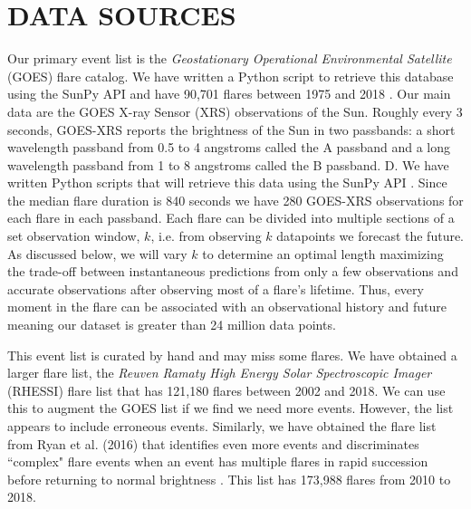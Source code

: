 \documentclass[letterpaper, 10 pt, onecolumn]{ieeeconf}
\begin{document}
\section{DATA SOURCES}
Our primary event list is the \textit{Geostationary Operational Environmental Satellite} (GOES) flare catalog. We have written a Python script to retrieve this database using the SunPy API and have 90,701 flares between 1975 and 2018 \cite{sunpy}. Our main data are the GOES X-ray Sensor (XRS) observations of the Sun. Roughly every 3 seconds, GOES-XRS reports the brightness of the Sun in two passbands: a short wavelength passband from 0.5 to 4 angstroms called the A passband and a long wavelength passband from 1 to 8 angstroms called the B passband. D. We have written Python scripts that will retrieve this data using the SunPy API \cite{sunpy}. Since the median flare duration is 840 seconds we have 280 GOES-XRS observations for each flare in each passband. Each flare can be divided into multiple sections of a set observation window, $k$, i.e. from observing $k$ datapoints we forecast the future. As discussed below, we will vary $k$ to determine an optimal length maximizing the trade-off between instantaneous predictions from only a few observations and accurate observations after observing most of a flare's lifetime. Thus, every moment in the flare can be associated with an observational history and future meaning our dataset is greater than 24 million data points. 

This event list is curated by hand and may miss some flares. We have obtained a larger flare list, the \textit{Reuven Ramaty High Energy Solar Spectroscopic Imager} (RHESSI) flare list that has 121,180 flares between 2002 and 2018. We can use this to augment the GOES list if we find we need more events. However, the list appears to include erroneous events. Similarly, we have obtained the flare list from Ryan et al. (2016) that identifies even more events and discriminates ``complex" flare events when an event has multiple flares in rapid succession before returning to normal brightness \cite{ryan}. This list has 173,988 flares from 2010 to 2018. 
\end{document}
